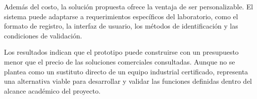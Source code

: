 Además del costo, la solución propuesta ofrece la ventaja de ser personalizable.
El sistema puede adaptarse a requerimientos específicos del laboratorio, como
el formato de registro, la interfaz de usuario, los métodos de identificación
y las condiciones de validación.

Los resultados indican que el prototipo puede construirse con un presupuesto
menor que el precio de las soluciones comerciales consultadas. Aunque no se
plantea como un sustituto directo de un equipo industrial certificado,
representa una alternativa viable para desarrollar y validar las funciones
definidas dentro del alcance académico del proyecto.
